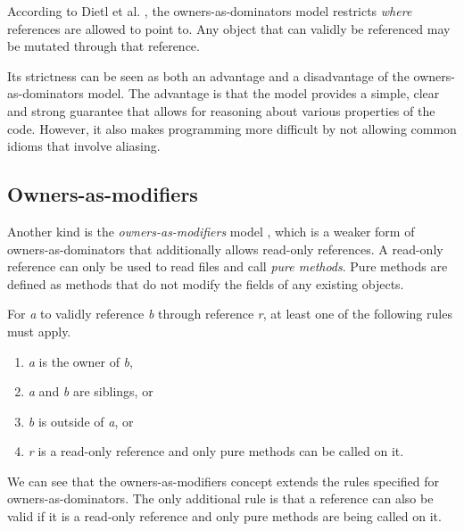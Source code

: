 \documentclass[sigplan,11pt,nonacm]{acmart}
\begin{document}
According to Dietl et al. \cite{lightweight-ownership}, the owners-as-dominators model restricts \emph{where} references are allowed to point to.
Any object that can validly be referenced may be mutated through that reference.

Its strictness can be seen as both an advantage and a disadvantage of the owners-as-dominators model.
The advantage is that the model provides a simple, clear and strong guarantee that allows for reasoning about various properties of the code.
However, it also makes programming more difficult by not allowing common idioms that involve aliasing. \cite{ownership-types-survey}








\subsection{Owners-as-modifiers}
\label{sec:owners-as-modifiers}

Another kind is the \emph{owners-as-modifiers} model \cite{ownership-types-survey}, which is a weaker form of owners-as-dominators that additionally allows read-only references.
A read-only reference can only be used to read files and call \emph{pure methods}.
Pure methods are defined as methods that do not modify the fields of any existing objects. \cite{ownership-types-survey}

For \emph{a} to validly reference \emph{b} through reference \emph{r}, at least one of the following rules \cite{ownership-types-survey} must apply.
\begin{enumerate}
  \item \emph{a} is the owner of \emph{b},
  \item \emph{a} and \emph{b} are siblings, or
  \item \emph{b} is outside of \emph{a}, or
  \item \emph{r} is a read-only reference and only pure methods can be called on it.
\end{enumerate}
We can see that the owners-as-modifiers concept extends the rules specified for owners-as-dominators.
The only additional rule is that a reference can also be valid if it is a read-only reference and only pure methods are being called on it.
\end{document}

